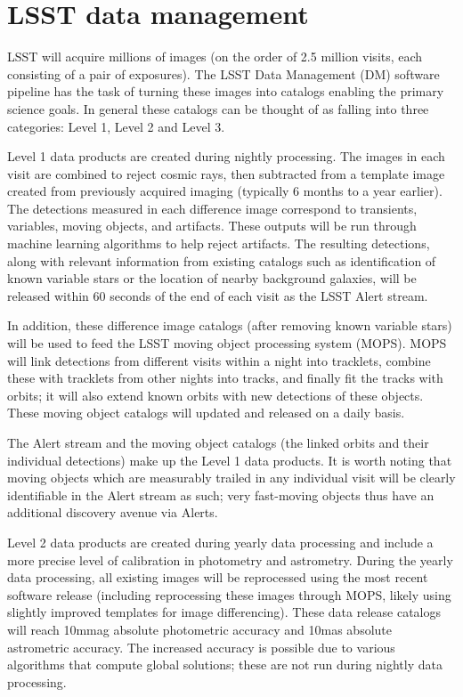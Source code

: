 \documentclass{iau}
\begin{document}
\section{LSST data management}

LSST will acquire millions of images (on the order of 2.5 million
visits, each consisting of a pair of exposures). The LSST Data
Management (DM) software pipeline has the task of turning these images
into catalogs enabling the primary science goals. In general these
catalogs can be thought of as falling into three categories: Level 1,
Level 2 and Level 3.

Level 1 data products are created during nightly processing. The
images in each visit are combined to reject cosmic rays, then
subtracted from a template image created from previously acquired
imaging (typically 6 months to a year earlier). The detections
measured in each difference image correspond to transients, variables,
moving objects, and artifacts. These outputs will be run through
machine learning algorithms to help reject artifacts. The resulting
detections, along with relevant information from existing catalogs
such as identification of known variable stars or the location of
nearby background galaxies, will be released within 60 seconds of the
end of each visit as the LSST Alert stream.

In addition, these difference image catalogs (after removing known
variable stars) will be used to feed the LSST moving object processing
system (MOPS). MOPS will link detections from different visits within
a night into tracklets, combine these with tracklets from
other nights into tracks, and finally fit the tracks with orbits; it will also extend
known orbits with new detections of these objects. These moving object
catalogs will updated and released on a daily basis.

The Alert stream and the moving object catalogs (the linked orbits and
their individual detections) make up the Level 1 data products. It is
worth noting that moving objects which are measurably trailed in any
individual visit will be clearly identifiable in the Alert stream as
such; very fast-moving objects thus have an additional discovery
avenue via Alerts.

Level 2 data products are created during yearly data processing and
include a more precise level of calibration in photometry and
astrometry. During the yearly data processing, all existing images
will be reprocessed using the most recent software release (including
reprocessing these images through MOPS, likely using slightly
improved templates for image differencing). These
data release catalogs will reach 10mmag absolute photometric accuracy
and 10mas absolute astrometric accuracy. The increased accuracy is
possible due to various algorithms that compute global solutions;
these are not run during nightly data processing.
\end{document}
